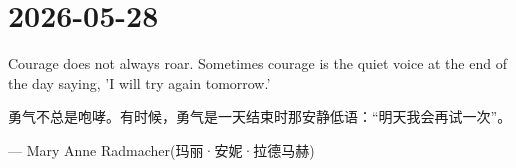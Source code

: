 \section*{2026-05-28}
Courage does not always roar. Sometimes courage is the quiet voice at the end of the day saying, 'I will try again tomorrow.' \par
勇气不总是咆哮。有时候，勇气是一天结束时那安静低语：“明天我会再试一次”。\par
\hfill --- Mary Anne Radmacher(玛丽·安妮·拉德马赫) \par

